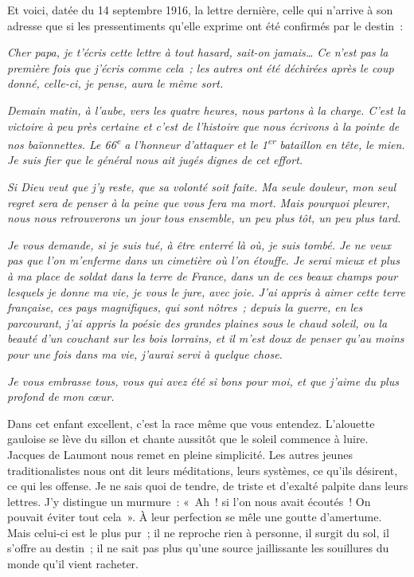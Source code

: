 \documentclass[french,twoside]{book} %
\begin{document}
\noindent Et voici, datée du 14 septembre 1916, la lettre dernière, celle qui n’arrive à son adresse que si les pressentiments qu’elle exprime ont été confirmés par le destin :‌\par
\par
{\itshape Cher papa, je t’écris cette lettre à tout hasard, sait-on jamais… Ce n’est pas la première fois que j’écris comme cela ; les autres ont été déchirées après le coup donné, celle-ci, je pense, aura le même sort.}\par
{\itshape Demain matin, à l’aube, vers les quatre heures, nous partons à la charge. C’est la victoire à peu près certaine et c’est de l’histoire que nous écrivons à la pointe de nos baïonnettes. Le 66\textsuperscript{e} a l’honneur d’attaquer et le 1\textsuperscript{er} bataillon en tête, le mien. Je suis fier que le général nous ait jugés dignes de cet effort.}\par
{\itshape Si Dieu veut que j’y reste, que sa volonté soit faite. Ma seule douleur, mon seul regret sera de penser à la peine que vous fera ma mort. Mais pourquoi pleurer, nous nous retrouverons un jour tous ensemble, un peu plus tôt, un peu plus tard.}\par
{\itshape Je vous demande, si je suis tué, à être enterré là où, je suis tombé. Je ne veux pas que l’on m’enferme dans un cimetière où l’on étouffe. Je serai mieux et plus à ma place de soldat dans la terre de France, dans un de ces beaux champs pour lesquels je donne ma vie, je vous le jure, avec joie. J’ai appris à aimer cette terre française, ces pays magnifiques, qui sont nôtres ; depuis la guerre, en les parcourant, j’ai appris la poésie des grandes plaines sous le chaud soleil, ou la beauté d’un couchant sur les bois lorrains, et il m’est doux de penser qu’au moins pour une fois dans ma vie, j’aurai servi à quelque chose.}\par
{\itshape Je vous embrasse tous, vous qui avez été si bons pour moi, et que j’aime du plus profond de mon cœur.}\par
\par
Dans cet enfant excellent, c’est la race même que vous entendez. L’alouette gauloise se lève du sillon et chante aussitôt que le soleil commence à luire. Jacques de Laumont nous remet en pleine simplicité. Les autres jeunes traditionalistes nous ont dit leurs méditations, leurs systèmes, ce qu’ils désirent, ce qui les offense. Je ne sais quoi de tendre, de triste et d’exalté palpite dans leurs lettres. J’y distingue un murmure : « Ah ! si l’on nous avait écoutés ! On pouvait éviter tout cela ». À leur perfection se mêle une goutte d’amertume. Mais celui-ci est le plus pur ; il ne reproche rien à personne, il surgit du sol, il s’offre au destin ; il ne sait pas plus qu’une source jaillissante les souillures du monde qu’il vient racheter.‌\par
\end{document}
